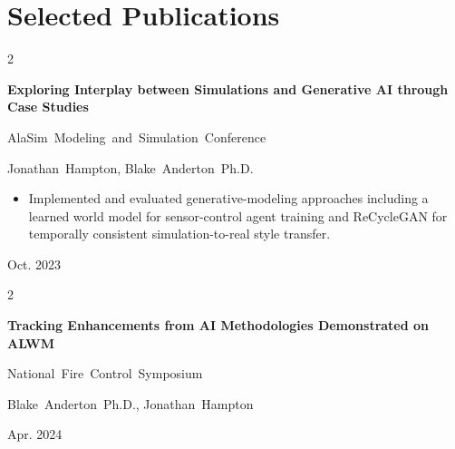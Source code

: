 \documentclass[10pt, letterpaper]{article}
\newenvironment{highlights}{
    \small\linespread{0.96}\selectfont
    \begin{itemize}[
        topsep=0.04 cm,
        parsep=0.02 cm,
        partopsep=0pt,
        itemsep=0pt,
        leftmargin=0.4 cm + 10pt
    ]
}{
    \end{itemize}
}
\newenvironment{twocolentry}[2][]{
    \onecolentry
    \def\secondColumn{#2}
    \setcolumnwidth{\fill, 4.5 cm}
    \begin{paracol}{2}
}{
    \switchcolumn \raggedleft \secondColumn
    \end{paracol}
    \endonecolentry
}
\begin{document}
    \section{Selected Publications}

        \begin{samepage}

            \begin{twocolentry}{
                Oct. 2023
            }
                \textbf{\small Exploring Interplay between Simulations and Generative AI through Case Studies}

                \mbox{\small AlaSim Modeling and Simulation Conference}

                \mbox{\small Jonathan Hampton}, \mbox{\small Blake Anderton Ph.D.}

                \begin{highlights}
                    \item {\small Implemented and evaluated generative-modeling approaches including a learned world model for sensor-control agent training
and ReCycleGAN for temporally consistent simulation-to-real style transfer.}
                \end{highlights}

                \vspace{0.05 cm}
            \end{twocolentry}

            \begin{twocolentry}{
                Apr. 2024
            }
                \textbf{\small Tracking Enhancements from AI Methodologies Demonstrated on ALWM}

                \mbox{\small National Fire Control Symposium}

                \mbox{\small Blake Anderton Ph.D.}, \mbox{\small Jonathan Hampton}
                \vspace{0.05 cm}
            \end{twocolentry}

        \end{samepage}
\end{document}
